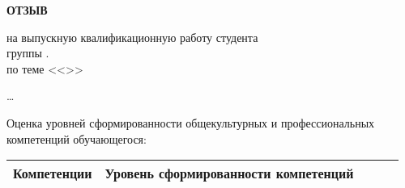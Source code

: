 
\vspace{0.1cm}
\begin{center}
    \LARGE
    {\bf ОТЗЫВ} \\
    \normalsize
\end{center}
\begin{center}
    на выпускную квалификационную работу студента \\
    группы \group \fio. \\
    по теме <<\topicname>>
\end{center}


\dots


Оценка уровней сформированности общекультурных и профессиональных
компетенций обучающегося:

\begin{table}[b]
    \begin{tabular}{|c|c|c|c|c|}
        \hline
        Компетенции & Уровень сформированности компетенций \\
        \hline
    \end{tabular}
\end{table}
\thispagestyle{empty}
\newpage
